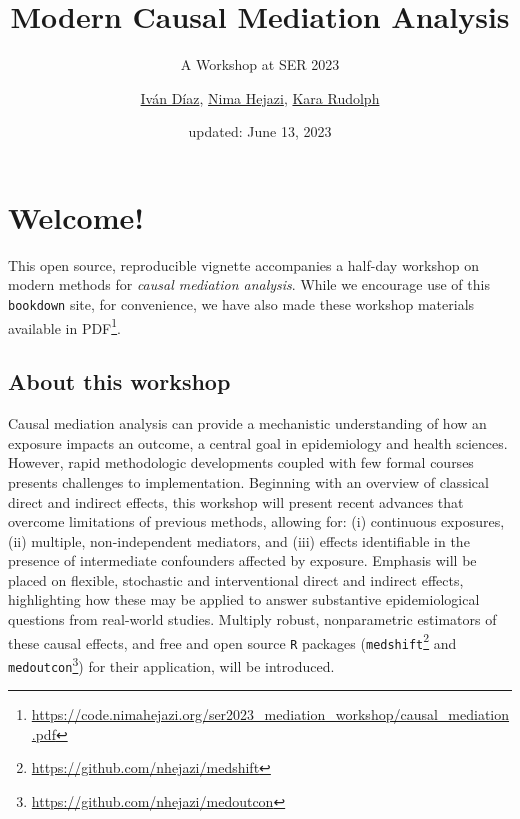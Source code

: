 \documentclass[
  12pt,
]{book}
\title{Modern Causal Mediation Analysis}
\subtitle{A Workshop at SER 2023}
\author{\href{https://www.idiaz.xyz/}{Iván Díaz}, \href{https://nimahejazi.org}{Nima Hejazi}, \href{https://kararudolph.github.io/}{Kara Rudolph}}
\date{updated: June 13, 2023}
\newcommand{\passthrough}[1]{#1}
\renewcommand{\href}[2]{#2\footnote{\url{#1}}}
\theoremstyle{definition}
\theoremstyle{definition}
\theoremstyle{definition}
\newcommand{\1}{\mathbbm{1}}
\begin{document}
\maketitle


\thispagestyle{empty}

\begin{center}
\end{center}

\setlength{\abovedisplayskip}{-5pt}
\setlength{\abovedisplayshortskip}{-5pt}

\mainmatter

{
\hypersetup{linkcolor=}
\setcounter{tocdepth}{2}
\tableofcontents
}
\hypertarget{welcome}{%
\chapter*{Welcome!}\label{welcome}}


This open source, reproducible vignette accompanies a half-day workshop on
modern methods for \emph{causal mediation analysis}. While we encourage use of this
\passthrough{\lstinline!bookdown!} site, for convenience, we have also made these workshop materials
\href{https://code.nimahejazi.org/ser2023_mediation_workshop/causal_mediation.pdf}{available in
PDF}.

\hypertarget{about}{%
\section{About this workshop}\label{about}}

Causal mediation analysis can provide a mechanistic understanding of how an
exposure impacts an outcome, a central goal in epidemiology and health sciences.
However, rapid methodologic developments coupled with few formal courses
presents challenges to implementation. Beginning with an overview of classical
direct and indirect effects, this workshop will present recent advances that
overcome limitations of previous methods, allowing for: (i) continuous
exposures, (ii) multiple, non-independent mediators, and (iii) effects
identifiable in the presence of intermediate confounders affected by exposure.
Emphasis will be placed on flexible, stochastic and interventional direct and
indirect effects, highlighting how these may be applied to answer substantive
epidemiological questions from real-world studies. Multiply robust,
nonparametric estimators of these causal effects, and free and open source \passthrough{\lstinline!R!}
packages (\href{https://github.com/nhejazi/medshift}{\passthrough{\lstinline!medshift!}} and
\href{https://github.com/nhejazi/medoutcon}{\passthrough{\lstinline!medoutcon!}}) for their application, will
be introduced.
\end{document}
